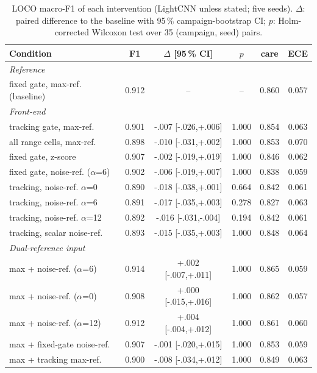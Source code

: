 \begin{table}[t]
\centering
\caption{LOCO macro-F1 of each intervention (LightCNN unless stated; five seeds). $\Delta$: paired difference to the baseline with 95\,\% campaign-bootstrap CI; $p$: Holm-corrected Wilcoxon test over 35 (campaign, seed) pairs.}
\label{tab:interventions}
\setlength{\tabcolsep}{1.8pt}
\scriptsize
\begin{tabular}{lccccc}
\toprule
Condition & F1 & $\Delta$ [95\,\% CI] & $p$ & care & ECE \\
\midrule
\multicolumn{6}{l}{\emph{Reference}} \\
\quad fixed gate, max-ref. (baseline) & 0.912 & -- & -- & 0.860 & 0.057 \\
\multicolumn{6}{l}{\emph{Front-end}} \\
\quad tracking gate, max-ref. & 0.901 & -.007 [-.026,+.006] & 1.000 & 0.854 & 0.063 \\
\quad all range cells, max-ref. & 0.898 & -.010 [-.031,+.002] & 1.000 & 0.853 & 0.070 \\
\quad fixed gate, z-score & 0.907 & -.002 [-.019,+.019] & 1.000 & 0.846 & 0.062 \\
\quad fixed gate, noise-ref. ($\alpha$=6) & 0.902 & -.006 [-.019,+.007] & 1.000 & 0.838 & 0.059 \\
\quad tracking, noise-ref. $\alpha$=0 & 0.890 & -.018 [-.038,+.001] & 0.664 & 0.842 & 0.061 \\
\quad tracking, noise-ref. $\alpha$=6 & 0.891 & -.017 [-.035,+.003] & 0.278 & 0.827 & 0.063 \\
\quad tracking, noise-ref. $\alpha$=12 & 0.892 & -.016 [-.031,-.004] & 0.194 & 0.842 & 0.061 \\
\quad tracking, scalar noise-ref. & 0.893 & -.015 [-.035,+.003] & 1.000 & 0.848 & 0.064 \\
\multicolumn{6}{l}{\emph{Dual-reference input}} \\
\quad max + noise-ref. ($\alpha$=6) & 0.914 & +.002 [-.007,+.011] & 1.000 & 0.865 & 0.059 \\
\quad max + noise-ref. ($\alpha$=0) & 0.908 & +.000 [-.015,+.016] & 1.000 & 0.862 & 0.057 \\
\quad max + noise-ref. ($\alpha$=12) & 0.912 & +.004 [-.004,+.012] & 1.000 & 0.861 & 0.060 \\
\quad max + fixed-gate noise-ref. & 0.907 & -.001 [-.020,+.015] & 1.000 & 0.853 & 0.059 \\
\quad max + tracking max-ref. & 0.900 & -.008 [-.034,+.012] & 1.000 & 0.849 & 0.063 \\

\end{tabular}
\end{table}

